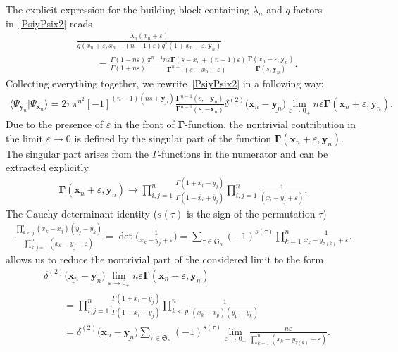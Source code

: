 \documentclass[10pt,a4paper]{amsart}
\numberwithin{equation}{section}
\begin{document}
The explicit expression for the building block containing
$\lambda_n$ and $q$-factors in~\eqref{PsiyPsix2} reads
\begin{align*}
&\frac{\lambda_n(x_n+\varepsilon)}
{q(x_n+\varepsilon, x_n-(n-1)\varepsilon) q^\ast(1+x_n-\varepsilon,\bm{y}_n)} \\
& \qquad =
\frac{\Gamma(1-n\varepsilon)}{\Gamma(1+n\varepsilon)} \frac{\pi^{n-1} n\varepsilon
\mathbf{\Gamma}(s-x_n+(n-1)\varepsilon)}{\mathbf{\Gamma}^{n-1}(s+x_n+\varepsilon)}
\frac{\mathbf{\Gamma}(x_n+\varepsilon ,\bm{y}_n)}
{\mathbf{\Gamma}(s ,\bm{y}_n)} .
\end{align*}
Collecting everything together, we rewrite~\eqref{PsiyPsix2} in a following way:
\begin{align*}
\langle\Psi_{\bm{y}_n}|\Psi_{\bm{x}_n}\rangle =
2\pi \pi^{n^2} [-1]^{(n-1)(ns+\underline{\bm{y}_n})}
\frac{\mathbf{\Gamma}^{n-1}(s ,-\bm{y}_n)}
{\mathbf{\Gamma}^{n-1}(s ,-\bm{x}_n)}
\delta^{(2)}\bigl(\underline{\bm{x}_n}-\underline{\bm{y}_n}\bigr)
\lim_{\varepsilon\to 0_+}
n \varepsilon \mathbf{\Gamma}(\bm{x}_n+\varepsilon, \bm{y}_n) .
\end{align*}
Due to the presence of $\varepsilon$ in the front of $\mathbf{\Gamma}$-function, the nontrivial contribution
in the limit $\varepsilon \to 0$ is defined by the singular
part of the function $\mathbf{\Gamma}(\bm{x}_n+\varepsilon, \bm{y}_n)$.
The singular part arises from the $\Gamma$-functions in the numerator
and can be extracted explicitly
\begin{align*}
\mathbf{\Gamma}(\bm{x}_n+\varepsilon, \bm{y}_n) \to
\prod\limits_{i,j=1}^n
\frac{\Gamma(1+x_i-y_j)}{\Gamma(1 -\bar{x}_i+\bar{y}_j)}
\prod\limits_{i,j=1}^n
\frac{1}{(x_i-y_j+\varepsilon)} .
\end{align*}
The Cauchy determinant identity ($s(\tau)$ is the sign of the permutation $\tau$)
\begin{align*}
\frac{\prod\limits_{k<j}^n (x_{k}-x_{j}) (y_{j}-y_{k})}{\prod\limits_{k,j=1}^{n}(x_k-y_j+\varepsilon)}
= \det\biggl(\frac{1}{x_k-y_{j}+\varepsilon}\biggr) =
\sum_{\tau\in \mathfrak{S}_{n}} (-1)^{s(\tau)}
\prod_{k=1}^{n}\frac{1}{x_k-y_{\tau(k)}+\varepsilon} .
\end{align*}
allows us to reduce the nontrivial part of the considered limit to the form
\begin{align*}
&
\delta^{(2)}\bigl(\underline{\bm{x}_n}-\underline{\bm{y}_n}\bigr)
\lim_{\varepsilon\to 0_+}
n \varepsilon \mathbf{\Gamma}(\bm{x}_n+\varepsilon, \bm{y}_n) \\
& \qquad =
\prod\limits_{i,j=1}^n
\frac{\Gamma(1+x_i-y_j)}{\Gamma(1 -\bar{x}_i+\bar{y}_j)}
\prod\limits_{k<p}^n \frac{1}
{(x_{k}-x_{p}) (y_{p}-y_{k})} \\
& \qquad =
\delta^{(2)}\bigl(\underline{\bm{x}_n}-\underline{\bm{y}_n}\bigr)
\sum_{\tau\in \mathfrak{S}_{n}} (-1)^{s(\tau)}
\lim_{\varepsilon\to 0_+}
\frac{n \varepsilon}{\prod_{k=1}^{n}(x_k-y_{\tau(k)}+\varepsilon)} .
\end{align*}
\end{document}
